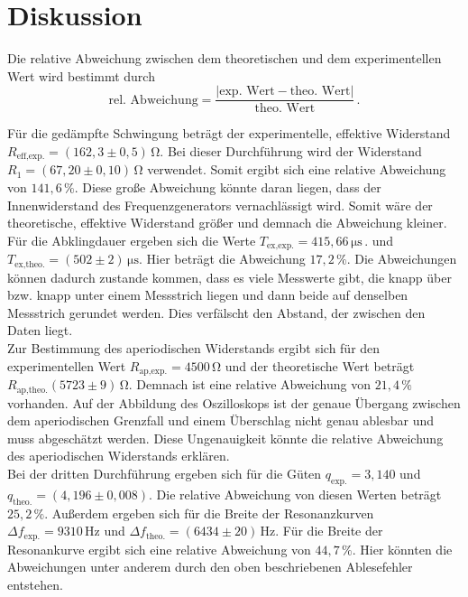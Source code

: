 \section{Diskussion}
\label{sec:Diskussion}
Die relative Abweichung zwischen dem theoretischen und dem experimentellen Wert wird bestimmt durch
$$\text{rel. Abweichung} = \frac{|\text{exp. Wert} - \text{theo. Wert}|}{\text{theo. Wert}}\,.$$

Für die gedämpfte Schwingung beträgt der experimentelle, effektive Widerstand $R_{\text{eff,exp.}} = \left(162,3 \pm 0,5\right)\,\unit{\ohm}$.
Bei dieser Durchführung wird der Widerstand $R_1 = \left(67,20 \pm 0,10\right)\,\unit{\ohm}$ verwendet. Somit ergibt sich eine relative Abweichung 
von $141,6\,\%$. Diese große Abweichung könnte daran liegen, dass der Innenwiderstand des Frequenzgenerators vernachlässigt wird. Somit wäre 
der theoretische, effektive Widerstand größer und demnach die Abweichung kleiner. Für die Abklingdauer ergeben sich die Werte $T_{\text{ex,exp.}}= 415,66\,\unit{\micro\second}\,.$ und
$T_{\text{ex,theo.}}= \left(502\pm2\right)\,\unit{\micro\second}$. Hier beträgt die Abweichung $17,2\,\%$. Die Abweichungen können 
dadurch zustande kommen, dass es viele Messwerte gibt, die knapp über bzw. knapp unter einem Messstrich
liegen und dann beide auf denselben Messstrich gerundet werden. Dies verfälscht den Abstand, der zwischen den Daten liegt. \\
Zur Bestimmung des aperiodischen Widerstands ergibt sich für den experimentellen Wert $R_{\text{ap,exp.}} = 4500 \,\unit{\ohm}$ und der theoretische
Wert beträgt $R_{\text{ap,theo.}}\left(5723\pm9\right)\,\unit{\ohm}$. Demnach ist eine relative Abweichung von $21,4\,\%$ vorhanden. Auf der Abbildung des Oszilloskops
ist der genaue Übergang zwischen dem aperiodischen Grenzfall und einem Überschlag nicht genau ablesbar und muss abgeschätzt werden. Diese Ungenauigkeit könnte die relative Abweichung 
des aperiodischen Widerstands erklären.\\
Bei der dritten Durchführung ergeben sich für die Güten $q_{\text{exp.}} = 3,140 $ und $q_{\text{theo.}} =\left(4,196\pm0,008\right)$. Die relative Abweichung
von diesen Werten beträgt $25,2\,\%$. Außerdem ergeben sich für die Breite der Resonanzkurven $\Delta f_{\text{exp.}} =9310\,\unit{\hertz}$ und
$\Delta f_{\text{theo.}} =\left(6434\pm20\right)\,\unit{\hertz}$. Für die Breite der Resonankurve ergibt sich eine relative Abweichung von $44,7\,\%$.
Hier könnten die Abweichungen unter anderem durch den oben beschriebenen Ablesefehler entstehen. 

